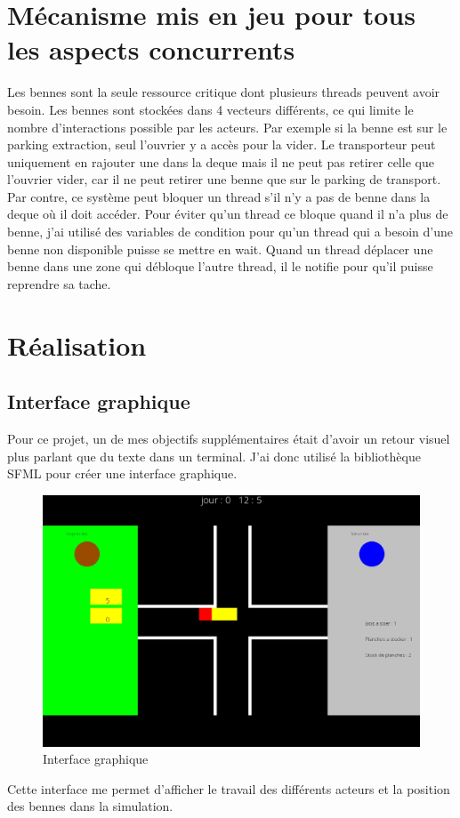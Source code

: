 \documentclass[a4paper, 12pt, oneside]{article}
\begin{document}
        

    \newpage    
    \section{Mécanisme mis en jeu pour tous les aspects concurrents}
    Les bennes sont la seule ressource critique dont plusieurs threads peuvent avoir besoin. Les bennes sont stockées dans 4 vecteurs différents, ce qui limite le nombre
    d'interactions possible par les acteurs. Par exemple si la benne est sur le parking extraction, seul l'ouvrier y a accès pour la vider. Le transporteur peut
    uniquement en rajouter une dans la deque mais il ne peut pas retirer celle que l'ouvrier vider, car il ne peut retirer une benne que sur le parking de transport.
    Par contre, ce système peut bloquer un thread s’il n'y a pas de benne dans la deque où il doit accéder. Pour éviter qu'un thread ce bloque quand il n'a plus
    de benne, j'ai utilisé des variables de condition pour qu'un thread qui a besoin d'une benne non disponible puisse se mettre en wait. Quand un thread déplacer
    une benne dans une zone qui débloque l'autre thread, il le notifie pour qu'il puisse reprendre sa tache.
    \newpage
    \section{Réalisation}
    \subsection{Interface graphique}
    Pour ce projet, un de mes objectifs supplémentaires était d'avoir un retour visuel plus parlant que du texte dans un terminal. J'ai donc utilisé la bibliothèque 
    SFML pour créer une interface graphique.
    \begin{figure}[H]
        \centering
        \includegraphics[scale=0.5]{images/interface graphique.jpg}
        \caption{Interface graphique}
    \end{figure}
    Cette interface me permet d'afficher le travail des différents acteurs et la position des bennes dans la simulation.
\end{document}
